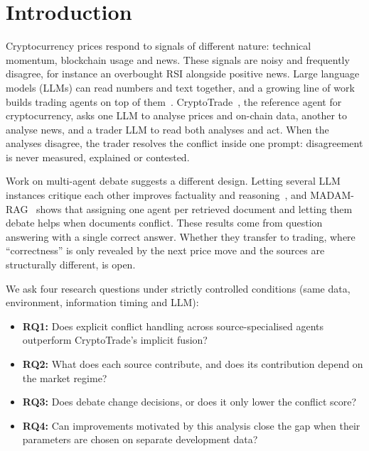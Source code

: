 \documentclass[11pt]{article}
\begin{document}
\section{Introduction}

Cryptocurrency prices respond to signals of different nature: technical momentum, blockchain usage and news. These
signals are noisy and frequently disagree, for instance an overbought RSI alongside positive news. Large language models
(LLMs) can read numbers and text together, and a growing line of work builds trading agents on top of
them~\citep{yu2023finmem,yu2024fincon,xiao2024tradingagents,li2024cryptotrade}. CryptoTrade~\citep{li2024cryptotrade},
the reference agent for cryptocurrency, asks one LLM to analyse prices and on-chain data, another to analyse news,
and a trader LLM to read both analyses and act. When the analyses disagree, the trader resolves the conflict inside one
prompt: disagreement is never measured, explained or contested.

Work on multi-agent debate suggests a different design. Letting several LLM instances critique each other improves
factuality and reasoning~\citep{du2024debate,liang2024divergent}, and MADAM-RAG~\citep{wang2025madamrag} shows that
assigning one agent per retrieved document and letting them debate helps when documents conflict. These results come
from question answering with a single correct answer. Whether they transfer to trading, where ``correctness'' is only
revealed by the next price move and the sources are structurally different, is open.

We ask four research questions under strictly controlled conditions (same data, environment, information timing and
LLM):
\begin{itemize}\setlength\itemsep{1pt}
  \item \textbf{RQ1:} Does explicit conflict handling across source-specialised agents outperform CryptoTrade's
  implicit fusion?
  \item \textbf{RQ2:} What does each source contribute, and does its contribution depend on the market regime?
  \item \textbf{RQ3:} Does debate change decisions, or does it only lower the conflict score?
  \item \textbf{RQ4:} Can improvements motivated by this analysis close the gap when their parameters are chosen on
  separate development data?
\end{itemize}
\end{document}
